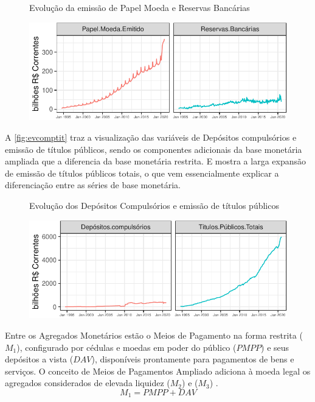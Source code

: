 \documentclass[12pt,12pt,openright,oneside,a4paper,chapter=TITLE,section=TITLE,subsection=TITLE,subsubsection=TITLE,english,french,spanish,portugues,sumario=tradicional]{abntex2}
\begin{document}
\begin{figure}
 {Evolução da emissão de Papel Moeda e Reservas Bancárias}

\begin{center}\includegraphics{12-exportedfigures/base moneybase.e-1} \end{center}
\label{fig:evpperb}
\end{figure}

A \autoref{fig:evcomptit} traz a visualização das variáveis de Depósitos compulsórios e emissão de títulos públicos, sendo os componentes adicionais da base monetária ampliada que a diferencia da base monetária restrita. E mostra a larga expansão de emissão de títulos públicos totais, o que vem essencialmente explicar a diferenciação entre as séries de base monetária.

\begin{figure}
 {Evolução dos Depósitos Compulsórios e emissão de títulos públicos}

\begin{center}\includegraphics{12-exportedfigures/base components-1} \end{center}
\label{fig:evcomptit}
\end{figure}

Entre os Agregados Monetários estão o Meios de Pagamento na forma restrita (\(M_1\)), configurado por cédulas e moedas em poder do público (\(PMPP\)) e seus depósitos a vista (\(DAV\)), disponíveis prontamente para pagamentos de bens e serviços. O conceito de Meios de Pagamentos Ampliado adiciona à moeda legal os agregados considerados de elevada liquidez (\(M_2\)) e (\(M_3\)) \cite{bcb:2019} \cite{sgs:mpa}.
\[
M_1 = PMPP + DAV
\]
\end{document}
